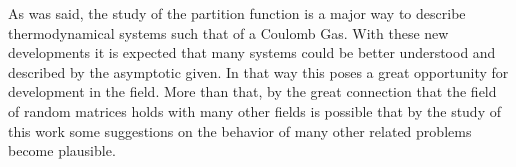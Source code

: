 As was said, the study of the partition function is a major way to describe thermodynamical systems such that of a Coulomb Gas. With these new developments it is expected that many systems could be better understood and described by the asymptotic given. In that way this poses a great opportunity for development in the field. More than that, by the great connection that the field of random matrices holds with many other fields is possible that by the study of this work some suggestions on the behavior of many other related problems become plausible.
